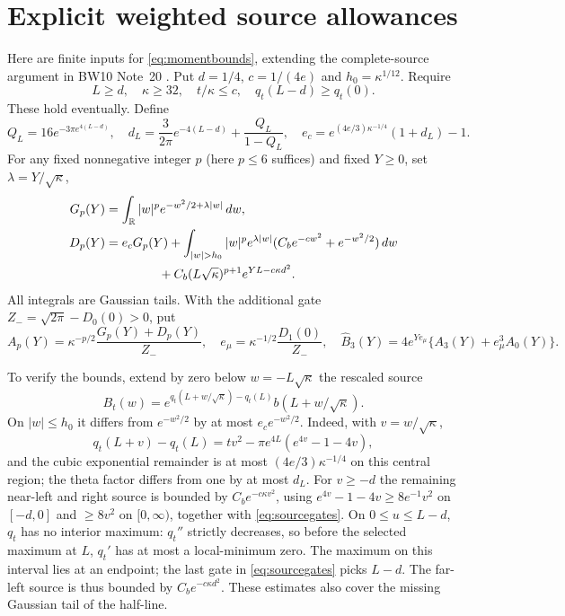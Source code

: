 \section{Explicit weighted source allowances}\label{app:source}
Here are finite inputs for \eqref{eq:momentbounds}, extending the
complete-source argument in BW10 Note~20 \cite{bw20,n12}.
Put $d=1/4$, $c=1/(4e)$ and $h_0=\kappa^{1/12}$.
Require
\begin{equation}
 L\ge d,\quad \kappa\ge32,\quad t/\kappa\le c,\quad
 q_t(L-d)\ge q_t(0).
 \label{eq:sourcegates}
\end{equation}
These hold eventually. Define
\[
 Q_L=16e^{-3\pi e^{4(L-d)}},\quad
 d_L=\frac3{2\pi}e^{-4(L-d)}+\frac{Q_L}{1-Q_L},\quad
 e_c=e^{(4e/3)\kappa^{-1/4}}(1+d_L)-1.
\]
For any fixed nonnegative integer $p$ (here $p\le6$ suffices) and fixed $Y\ge0$, set $\lambda=Y/\sqrt\kappa$,
\begin{align}
 G_p(Y)&=\int_\R|w|^pe^{-w^2/2+\lambda|w|}\,dw,\notag\\
 D_p(Y)&=e_cG_p(Y)
 +\int_{|w|>h_0}|w|^pe^{\lambda|w|}
            (C_be^{-cw^2}+e^{-w^2/2})\,dw\notag\\
 &\hspace{15mm}
 +C_b(L\sqrt\kappa)^{p+1}e^{YL-c\kappa d^2}. \label{eq:Dp}
\end{align}
All integrals are Gaussian tails.
With the additional gate $Z_-=\sqrt{2\pi}-D_0(0)>0$, put
\begin{equation}
 A_p(Y)=\kappa^{-p/2}\frac{G_p(Y)+D_p(Y)}{Z_-},\quad
 e_\mu=\kappa^{-1/2}\frac{D_1(0)}{Z_-},\quad
 \widehat B_3(Y)=4e^{Ye_\mu}\{A_3(Y)+e_\mu^3A_0(Y)\}.
 \label{eq:allowances}
\end{equation}

To verify the bounds, extend by zero below $w=-L\sqrt\kappa$ the
rescaled source
\[
 B_t(w)=e^{q_t(L+w/\sqrt\kappa)-q_t(L)}
                         b(L+w/\sqrt\kappa).
\]
On $|w|\le h_0$ it differs from $e^{-w^2/2}$ by at most
$e_ce^{-w^2/2}$. Indeed, with $v=w/\sqrt\kappa$,
\[
 q_t(L+v)-q_t(L)
 =tv^2-\pi e^{4L}(e^{4v}-1-4v),
\]
and the cubic exponential remainder is at most
$(4e/3)\kappa^{-1/4}$ on this central region; the theta factor
differs from one by at most $d_L$.
For $v\ge-d$ the remaining near-left and right source is bounded
by $C_be^{-c\kappa v^2}$, using
$e^{4v}-1-4v\ge8e^{-1}v^2$ on $[-d,0]$ and
$\ge8v^2$ on $[0,\infty)$, together with \eqref{eq:sourcegates}.
On $0\le u\le L-d$, $q_t$ has no interior maximum:
$q_t''$ strictly decreases, so before the selected maximum at $L$,
$q_t'$ has at most a local-minimum zero.
The maximum on this interval lies at an endpoint; the last gate
in \eqref{eq:sourcegates} picks $L-d$.
The far-left source is thus bounded by $C_be^{-c\kappa d^2}$.
These estimates also cover the missing Gaussian tail of the half-line.

